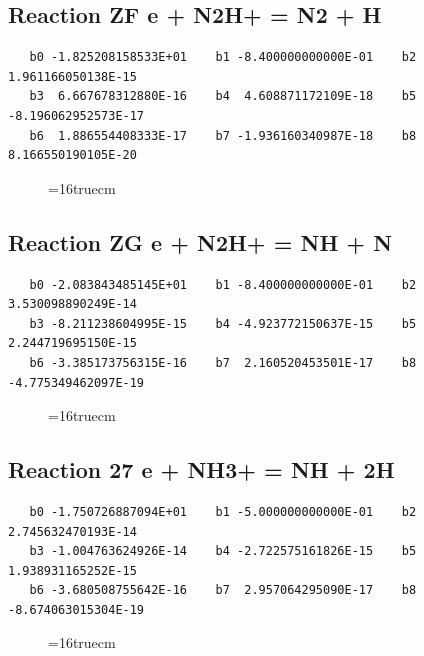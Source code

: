\documentclass[12pt,dvipdfm]{article}
\begin{document}
\subsection{
Reaction ZF e + N2H+ = N2 + H}
\begin{small}\begin{verbatim}
   b0 -1.825208158533E+01    b1 -8.400000000000E-01    b2  1.961166050138E-15
   b3  6.667678312880E-16    b4  4.608871172109E-18    b5 -8.196062952573E-17
   b6  1.886554408333E-17    b7 -1.936160340987E-18    b8  8.166550190105E-20
   \end{verbatim}\end{small}
\begin{figure}[h!]
\label{n2rates}
\epsfxsize=16truecm
\end{figure}
\newpage

\subsection{
Reaction ZG e + N2H+ = NH + N}
\begin{small}\begin{verbatim}
   b0 -2.083843485145E+01    b1 -8.400000000000E-01    b2  3.530098890249E-14
   b3 -8.211238604995E-15    b4 -4.923772150637E-15    b5  2.244719695150E-15
   b6 -3.385173756315E-16    b7  2.160520453501E-17    b8 -4.775349462097E-19
   \end{verbatim}\end{small}
\begin{figure}[h!]
\label{n2rates}
\epsfxsize=16truecm
\end{figure}
\newpage

\subsection{
Reaction 27 e + NH3+ = NH + 2H}
\begin{small}\begin{verbatim}
   b0 -1.750726887094E+01    b1 -5.000000000000E-01    b2  2.745632470193E-14
   b3 -1.004763624926E-14    b4 -2.722575161826E-15    b5  1.938931165252E-15
   b6 -3.680508755642E-16    b7  2.957064295090E-17    b8 -8.674063015304E-19
   \end{verbatim}\end{small}
\begin{figure}[h!]
\label{n2rates}
\epsfxsize=16truecm
\end{figure}
\newpage
\end{document}
